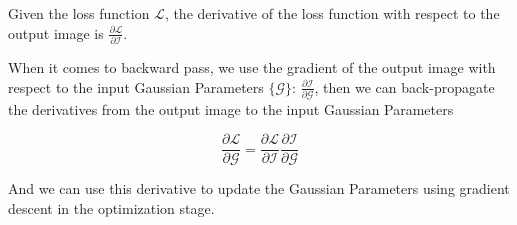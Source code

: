 Given the loss function $\mathcal{L}$, 
the derivative of the loss function with respect to the 
output image is $\frac{\partial \mathcal{L}}{\partial \mathcal{I}}$.

When it comes to backward pass, 
we use the gradient of the output image 
with respect to the input Gaussian Parameters $\{\mathcal{G}\}$: 
$\frac{\partial \mathcal{I}}{\partial \mathcal{G}}$, 
then we can back-propagate the derivatives from the output image 
to the input Gaussian Parameters 

$$\frac{\partial \mathcal{L}}{\partial \mathcal{G}} = \frac{\partial \mathcal{L}}{\partial \mathcal{I}}\frac{\partial \mathcal{I}}{\partial \mathcal{G}}$$

And we can use this derivative to update the Gaussian Parameters using gradient descent in the optimization stage.